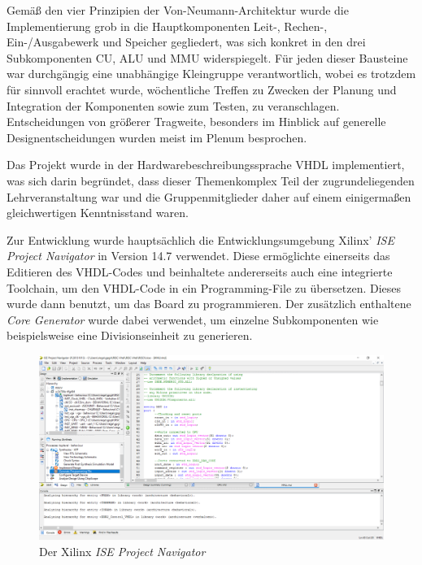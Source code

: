 Gem\"a\ss{} den vier Prinzipien der Von-Neumann-Architektur wurde die
Implementierung grob in die Hauptkomponenten Leit-, Rechen-,
Ein-/Ausgabewerk und Speicher gegliedert, was sich konkret in den drei
Subkomponenten CU, ALU und MMU widerspiegelt. F\"ur jeden dieser Bausteine
war durchg\"angig eine unabh\"angige Kleingruppe verantwortlich, wobei es
trotzdem f\"ur sinnvoll erachtet wurde, w\"ochentliche Treffen zu Zwecken der
Planung und Integration der Komponenten sowie zum Testen, zu veranschlagen.
Entscheidungen von gr\"o\ss{}erer Tragweite, besonders im Hinblick auf
generelle Designentscheidungen wurden meist im Plenum besprochen.

Das Projekt wurde in der Hardwarebeschreibungssprache VHDL implementiert, was
sich darin begr\"undet, dass dieser Themenkomplex Teil der zugrundeliegenden
Lehrveranstaltung war und die Gruppenmitglieder daher auf einem
einigerma\ss{}en gleichwertigen Kenntnisstand waren.

Zur Entwicklung wurde haupts\"achlich die Entwicklungsumgebung Xilinx'
\textit{ISE Project Navigator} in Version 14.7 verwendet. Diese erm\"oglichte
einerseits das Editieren des VHDL-Codes und beinhaltete andererseits auch eine
integrierte Toolchain, um den VHDL-Code in ein Programming-File zu
\"ubersetzen. Dieses wurde dann benutzt, um das Board zu programmieren. Der
zus\"atzlich enthaltene \textit{Core Generator} wurde dabei verwendet, um
einzelne Subkomponenten wie beispielsweise eine Divisionseinheit zu generieren.

\begin{figure}[H]
\centering
\label{fig:tool}
\includegraphics[width=1.0\textwidth]{ISE.png}
\caption{Der Xilinx \textit{ISE Project Navigator}}
\end{figure}

